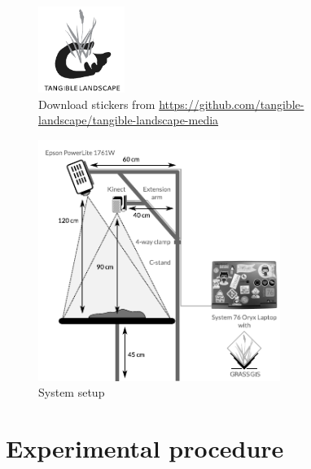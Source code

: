 \documentclass[prodmode,acmtochi]{acmsmall} %
\begin{document}
\begin{figure}
\begin{center}
	\includegraphics[width=0.25\textwidth]{images/tl_logo.pdf}
	\caption{Download stickers from \url{https://github.com/tangible-landscape/tangible-landscape-media}}
	\label{fig:stickers}
\end{center}
\end{figure}

\begin{figure}
\begin{center}
	\includegraphics[width=0.7\textwidth]{images/system_setup.pdf}
	\caption{System setup}
	\label{fig:system_setup}
\end{center}
\end{figure}

\vfill
\clearpage

\section{Experimental procedure}\label{appendix:procedure}
\end{document}
